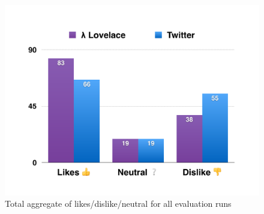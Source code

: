 \documentclass{article}
\begin{document}
\begin{figure}[H]
    \centering
    \includegraphics[page=6,width=\textwidth]{evaluation_charts}
    \caption{Total aggregate of likes/dislike/neutral for all evaluation runs}
\end{figure}
\end{document}
